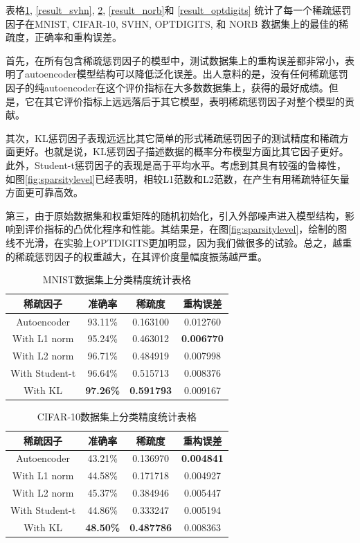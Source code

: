 \documentclass[oneside]{ZJUthesis}
\begin{document}
表格\ref{tab:result_mnist}, \ref{result_svhn}, \ref{result_cifar}, \ref{result_norb}和 \ref{result_optdigits} 统计了每一个稀疏惩罚因子在MNIST, CIFAR-10, SVHN, OPTDIGITS, 和 NORB 数据集上的最佳的稀疏度，正确率和重构误差。

首先，在所有包含稀疏惩罚因子的模型中，测试数据集上的重构误差都非常小，表明了autoencoder模型结构可以降低泛化误差。出人意料的是，没有任何稀疏惩罚因子的纯autoencoder在这个评价指标在大多数数据集上，获得的最好成绩。但是，它在其它评价指标上远远落后于其它模型，表明稀疏惩罚因子对整个模型的贡献。

其次，KL惩罚因子表现远远比其它简单的形式稀疏惩罚因子的测试精度和稀疏方面更好。也就是说，KL惩罚因子描述数据的概率分布模型方面比其它因子更好。此外，Student-t惩罚因子的表现是高于平均水平。考虑到其具有较强的鲁棒性，如图\ref{fig:sparsitylevel}已经表明，相较L1范数和L2范数，在产生有用稀疏特征矢量方面更可靠高效。

第三，由于原始数据集和权重矩阵的随机初始化，引入外部噪声进入模型结构，影响到评价指标的凸优化程序和性能。其结果是，在图\ref{fig:sparsitylevel}，绘制的图线不光滑，在实验上OPTDIGITS更加明显，因为我们做很多的试验。总之，越重的稀疏惩罚因子的权重越大，在其评价度量幅度振荡越严重。
\begin{table}[h]
\begin{center}
{
\caption{MNIST数据集上分类精度统计表格}\label{tab:result_mnist}}
\begin{tabular}{|c|c|c|c|}
\hline
稀疏因子 & 准确率 & 稀疏度 & 重构误差 \\
\hline
Autoencoder    & 93.11\% & 0.163100   & 0.012760 \\
\hline
With L1 norm   & 95.24\% & 0.463012 & \textbf{0.006770} \\
\hline
With L2 norm   & 96.71\% & 0.484919 & 0.007998 \\
\hline
With Student-t & 96.64\% & 0.515713 & 0.008376 \\
\hline
With KL        & \textbf{97.26\%} & \textbf{0.591793} & 0.009167 \\
\hline
\end{tabular}
\end{center}
\end{table}

\begin{table}[h]
\begin{center}
{
\caption{CIFAR-10数据集上分类精度统计表格}\label{result_cifar}}
\begin{tabular}{|c|c|c|c|}
\hline
稀疏因子 & 准确率 & 稀疏度 & 重构误差 \\
\hline
Autoencoder    & 43.21\%   & 0.136970 & \textbf{0.004841} \\
\hline
With L1 norm   & 44.58\%   & 0.171718 & 0.004927 \\
\hline
With L2 norm   & 45.37\%   & 0.384946 & 0.005447 \\
\hline
With Student-t &  44.86\%  & 0.333247 & 0.005194 \\
\hline
With KL  & \textbf{48.50\%} & \textbf{0.487786} & 0.008363 \\
\hline
\end{tabular}
\end{center}
\end{table}
\end{document}
